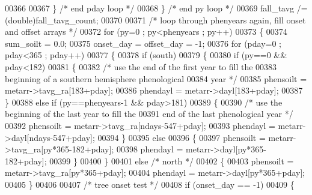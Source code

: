 \begin{DoxyCode}
{{00366                     
00367                 \} \textcolor{comment}{/* end pday loop */}
00368             \} \textcolor{comment}{/* end py loop */}
00369             fall\_tavg /= (double)fall\_tavg\_count;
00370             
00371             \textcolor{comment}{/* loop through phenyears again, fill onset and offset arrays */}
00372             \textcolor{keywordflow}{for} (py=0 ; py<phenyears ; py++)
00373             \{
00374                 sum\_soilt = 0.0;
00375                 onset\_day = offset\_day = -1;
00376                 \textcolor{keywordflow}{for} (pday=0 ; pday<365 ; pday++)
00377                 \{
00378                     \textcolor{keywordflow}{if} (south)
00379                     \{
00380                         \textcolor{keywordflow}{if} (py==0 && pday<182)
00381                         \{
00382                             \textcolor{comment}{/* use the end of the first year to fill the }
00383 \textcolor{comment}{                            beginning of a southern hemisphere phenological}
00384 \textcolor{comment}{                            year */}
00385                             phensoilt = metarr->tavg\_ra[183+pday];
00386                             phendayl = metarr->dayl[183+pday];
00387                         \}
00388                         \textcolor{keywordflow}{else} \textcolor{keywordflow}{if} (py==phenyears-1 && pday>181)
00389                         \{
00390                             \textcolor{comment}{/* use the beginning of the last year to fill the}
00391 \textcolor{comment}{                            end of the last phenological year */}
00392                             phensoilt = metarr->tavg\_ra[ndays-547+pday];
00393                             phendayl = metarr->dayl[ndays-547+pday];
00394                         \}
00395                         \textcolor{keywordflow}{else}
00396                         \{
00397                             phensoilt = metarr->tavg\_ra[py*365-182+pday];
00398                             phendayl = metarr->dayl[py*365-182+pday];
00399                         \}
00400                     \}
00401                     \textcolor{keywordflow}{else} \textcolor{comment}{/* north */}
00402                     \{
00403                         phensoilt = metarr->tavg\_ra[py*365+pday];
00404                         phendayl = metarr->dayl[py*365+pday];
00405                     \}
00406                     
00407                     \textcolor{comment}{/* tree onset test */}
00408                     \textcolor{keywordflow}{if} (onset\_day == -1)
00409                     \{
}}
\end{DoxyCode}
